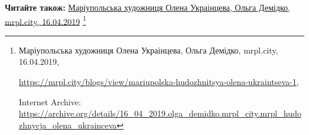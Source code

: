  
 
 
 
 

\def\pubIA{https://archive.org/details/16_04_2019.olga_demidko.mrpl_city.mrpl_hudozhnycja_olena_ukrainceva}
\def\pubTitle{Маріупольська художниця Олена Украінцева}
\def\pubDate{16.04.2019}
\def\pubOrigin{https://mrpl.city/blogs/view/mariupolska-hudozhnitsya-olena-ukraintseva-1}

\textbf{Читайте також:} \href{\pubIA}{%
\pubTitle, Ольга Демідко, mrpl.city, \pubDate}%
\footnote{\pubTitle, Ольга Демідко, mrpl.city, \pubDate, \par\url{\pubOrigin}, \par Internet Archive: \url{\pubIA}}
